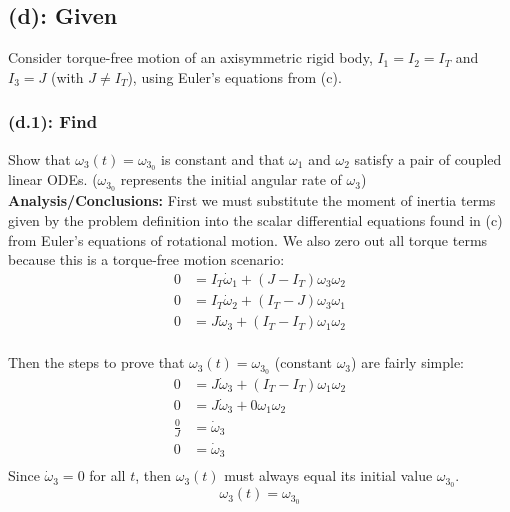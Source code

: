 \documentclass[titlepage]{article}
\begin{document}
\subsection*{(d): Given}
Consider torque-free motion of an axisymmetric rigid body, $I_1=I_2=I_T$ and $I_3=J$ (with $J\ne I_T$), using Euler's equations from (c).

\subsubsection*{(d.1): Find}
Show that $\omega_3(t)=\omega_{3_0}$ is constant and that $\omega_1$ and $\omega_2$ satisfy a pair of coupled linear ODEs. ($\omega_{3_0}$ represents the initial angular rate of $\omega_3$) \\

\textbf{Analysis/Conclusions:}
First we must substitute the moment of inertia terms given by the problem definition into the scalar differential equations found in (c) from Euler's equations of rotational motion. We also zero out all torque terms because this is a torque-free motion scenario:
\begin{equation}
	\begin{split}
		0&=I_T\dot{\omega}_1+\left(J-I_T\right)\omega_3\omega_2\\
		0&=I_T\dot{\omega}_2+\left(I_T-J\right)\omega_3\omega_1\\
		0&=J\dot{\omega}_3+\left(I_T-I_T\right)\omega_1\omega_2 \\
	\end{split}
\end{equation}

\begin{mdframed}[linewidth=1pt, innertopmargin=10pt, innerbottommargin=10pt]
	Then the steps to prove that $\omega_3(t)=\omega_{3_0}$ (constant $\omega_3$) are fairly simple:
	\begin{equation}
		\begin{split}
			0&=J\dot{\omega}_3+\left(I_T-I_T\right)\omega_1\omega_2 \\
			0&=J\dot{\omega}_3+0\omega_1\omega_2 \\
			\frac{0}{J}&=\dot{\omega}_3 \\
			0&=\dot{\omega}_3 \\
		\end{split}
	\end{equation}
	Since $\dot{\omega}_3=0$ for all $t$, then $\omega_3(t)$ must always equal its initial value $\omega_{3_0}$.
	\begin{equation}
		\omega_3(t)=\omega_{3_0}
	\end{equation}
\end{mdframed}
\end{document}
